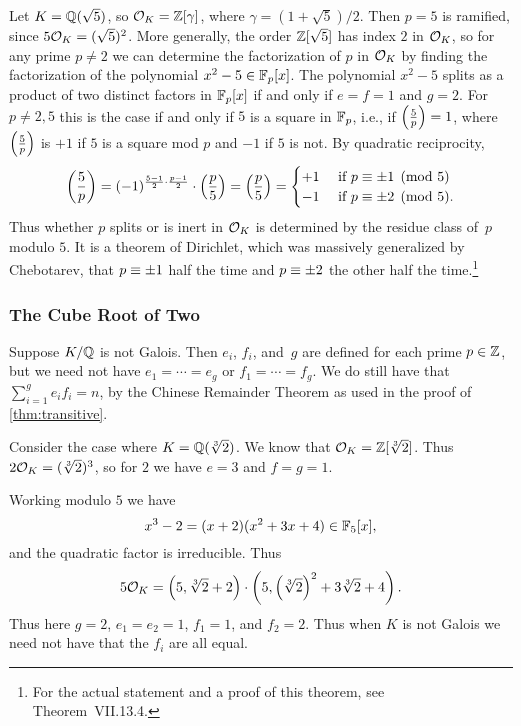 \begin{example}\label{exam:decompQsqrt5}
	Let $K=\mathbb{Q}(\sqrt{5})$, so $\mathcal{O}_K=\mathbb{Z}[\gamma]$, where
	$\gamma=(1+\sqrt{5})/2$.  Then $p=5$ is ramified, since $5\mathcal{O}_K =
	(\sqrt{5})^2$.  More generally, the order $\mathbb{Z}[\sqrt{5}]$ has index $2$
	in $\mathcal{O}_K$, so for any prime $p\neq 2$ we can determine the
	factorization of $p$ in $\mathcal{O}_K$ by finding the factorization of the
	polynomial $x^2-5\in \mathbb{F}_p[x]$.  The polynomial $x^2-5$ splits as a
	product of two distinct factors in $\mathbb{F}_p[x]$ if and only if $e=f=1$
	and $g=2$.  For $p\neq 2,5$ this is the case if and only if $5$ is a
	square in $\mathbb{F}_p$, i.e., if $\left(\frac{5}{p}\right) = 1$, where $\left(\frac{5}{p}\right)$ is $+1$
	if $5$ is a square mod $p$ and $-1$ if $5$ is not.  By quadratic
	reciprocity,
	$$
		\left(\frac{5}{p}\right)
		= (-1)^{\frac{5-1}{2}\cdot \frac{p-1}{2}} \cdot \left(\frac{p}{5}\right)
		= \left(\frac{p}{5}\right)
		= \begin{cases}
			+1 & \text{ if } p\equiv \pm 1\pmod{5} \\
			-1 & \text{ if } p \equiv \pm 2\pmod{5}.
		\end{cases}
	$$
	Thus whether $p$ splits or is inert in
	$\mathcal{O}_K$ is determined by the residue class of~$p$
	modulo $5$. It is a theorem of Dirichlet, which was massively
	generalized by Chebotarev, that $p\equiv \pm 1$ half the time
	and $p \equiv \pm 2$ the other half the time.\footnote{
	For the actual statement and a proof of this theorem,
	see \cite{neukirch1999} Theorem~VII.13.4.}
\end{example}

\subsubsection{The Cube Root of Two}

Suppose $K/\mathbb{Q}$ is not Galois.
Then $e_i$, $f_i$, and~$g$ are defined for each prime $p\in\mathbb{Z}$,
but we need not have $e_1=\cdots=e_g$ or $f_1=\cdots =f_g$.  We do still have that
$\sum_{i=1}^g e_i f_i = n$, by the Chinese Remainder Theorem as used in
the proof of \autoref{thm:transitive}.

Consider the case where $K=\mathbb{Q}(\sqrt[3]{2})$. We know that $\mathcal{O}_K = \mathbb{Z}[\sqrt[3]{2}]$.  Thus
$2\mathcal{O}_K = (\sqrt[3]{2})^3$, so for $2$ we have $e=3$ and $f=g=1$.

Working modulo $5$ we have
$$
	x^3 - 2 = (x+2)(x^2+3x+4) \in \mathbb{F}_5[x],
$$
and the quadratic factor is irreducible.  Thus
$$
	5\mathcal{O}_K = \left(5, \sqrt[3]{2}+2\right) \cdot \left(5, \left(\sqrt[3]{2}\right)^2 + 3\sqrt[3]{2} + 4\right).
$$
Thus here $g = 2$, $e_1 = e_2 = 1$, $f_1=1$, and $f_2 = 2$.
Thus when $K$ is not Galois we need not have that the $f_i$
are all equal.


